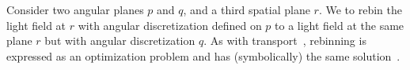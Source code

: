 Consider two angular planes $p$ and $q$, and a third spatial plane $r$.  We to
rebin the light field at $r$ with angular discretization defined on $p$ to a
light field at the same plane $r$ but with angular discretization $q$. As with
transport~, rebinning is expressed as an optimization problem
and has (symbolically) the same solution~.

